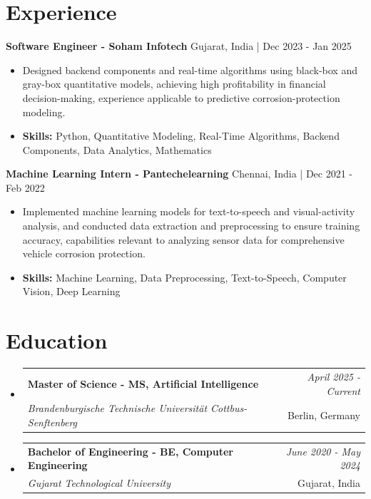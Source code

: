 \documentclass[a4paper,11pt]{article}
\makeatletter
\newcommand{\resumeSubheading}[4]{
\vspace{0.5mm}\item
    \begin{tabular*}{0.98\textwidth}[t]{l@{\extracolsep{\fill}}r}
        \textbf{#1} & \textit{\footnotesize{#4}} \\
        \textit{\footnotesize{#3}} &  \footnotesize{#2}\\
    \end{tabular*}
    \vspace{-2.4mm}
}
\makeatother
\begin{document}
\section{\textbf{Experience}}


\vspace{1mm}
  \textbf{Software Engineer - Soham Infotech} \hfill Gujarat, India | Dec 2023 - Jan 2025
\vspace{-1.5mm} %
\begin{itemize}
  \item Designed backend components and real-time algorithms using black-box and gray-box quantitative models, achieving high profitability in financial decision-making, experience applicable to predictive corrosion-protection modeling.

\vspace{-2mm}
  \item \textbf{Skills:} Python, Quantitative Modeling, Real-Time Algorithms, Backend Components, Data Analytics, Mathematics
\end{itemize}

\vspace{1mm}
  \textbf{Machine Learning Intern - Pantechelearning} \hfill Chennai, India | Dec 2021 - Feb 2022
\vspace{-1.5mm} %
\begin{itemize}
  \item Implemented machine learning models for text-to-speech and visual-activity analysis, and conducted data extraction and preprocessing to ensure training accuracy, capabilities relevant to analyzing sensor data for comprehensive vehicle corrosion protection.
\vspace{-2mm}
  \item \textbf{Skills:} Machine Learning, Data Preprocessing, Text-to-Speech, Computer Vision, Deep Learning
\end{itemize}\section{\textbf{Education}}
\vspace{-0.4mm}

\begin{itemize}
\resumeSubheading
{Master of Science - MS, Artificial Intelligence }{Berlin, Germany}
{Brandenburgische Technische Universität Cottbus-Senftenberg  }{April 2025 - Current}

\vspace{1.0mm} %
\resumeSubheading
{Bachelor of Engineering - BE, Computer Engineering  }{Gujarat, India}
{Gujarat Technological University }{June 2020 - May 2024}

\end{itemize}
\end{document}
